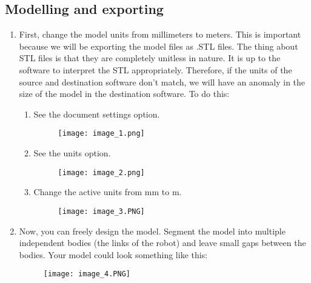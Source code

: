 \documentclass{article}
\begin{document}
        \subsection{Modelling and exporting}
            \begin{enumerate}
                \item First, change the model units from millimeters to meters. This is important 
                because we will be exporting the model files as .STL files. The thing about STL 
                files is that they are completely unitless in nature. It is up to the software to 
                interpret the STL appropriately. Therefore, if the units of the source and destination
                software don't match, we will have an anomaly in the size of the model in the destination 
                software. To do this:
                \begin{enumerate}
                    \item See the document settings option.
                    \begin{figure}[H]
                        \center
                        \texttt{[image: image\_1.png]}
                    \end{figure}
                    \item See the units option.
                    \begin{figure}[H]
                        \center
                        \texttt{[image: image\_2.png]}
                    \end{figure}
                    \newpage
                    \item Change the active units from mm to m.
                    \begin{figure}[H]
                        \center
                        \texttt{[image: image\_3.PNG]}
                    \end{figure}
                \end{enumerate}
                \item Now, you can freely design the model. Segment the model into multiple
                independent bodies (the links of the robot) and leave small gaps between the bodies. Your model
                could look something like this:
                \begin{figure}[H]
                    \center
                    \texttt{[image: image\_4.PNG]}
                \end{figure}

\end{enumerate}
\end{document}
